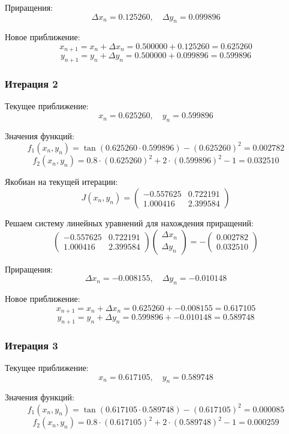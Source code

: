 \documentclass{article}
\begin{document}
Приращения:
\[
\Delta x_n = 0.125260, \quad \Delta y_n = 0.099896
\]

Новое приближение:
\[
x_{n+1} = x_n + \Delta x_n = 0.500000 + 0.125260 = 0.625260
\]
\[
y_{n+1} = y_n + \Delta y_n = 0.500000 + 0.099896 = 0.599896
\]

\subsubsection*{Итерация 2}

Текущее приближение:
\[
x_n = 0.625260, \quad y_n = 0.599896
\]

Значения функций:
\[
f_1(x_n, y_n) = \tan(0.625260 \cdot 0.599896) - (0.625260)^2 = 0.002782
\]
\[
f_2(x_n, y_n) = 0.8 \cdot (0.625260)^2 + 2 \cdot (0.599896)^2 - 1 = 0.032510
\]

Якобиан на текущей итерации:
\[
J(x_n, y_n) = \begin{pmatrix}
-0.557625 & 0.722191 \\
1.000416 & 2.399584
\end{pmatrix}
\]

Решаем систему линейных уравнений для нахождения приращений:
\[
\begin{pmatrix}
-0.557625 & 0.722191 \\
1.000416 & 2.399584
\end{pmatrix}
\begin{pmatrix}
\Delta x_n \\
\Delta y_n
\end{pmatrix}
= -\begin{pmatrix}
0.002782 \\
0.032510
\end{pmatrix}
\]

Приращения:
\[
\Delta x_n = -0.008155, \quad \Delta y_n = -0.010148
\]

Новое приближение:
\[
x_{n+1} = x_n + \Delta x_n = 0.625260 + -0.008155 = 0.617105
\]
\[
y_{n+1} = y_n + \Delta y_n = 0.599896 + -0.010148 = 0.589748
\]

\subsubsection*{Итерация 3}

Текущее приближение:
\[
x_n = 0.617105, \quad y_n = 0.589748
\]

Значения функций:
\[
f_1(x_n, y_n) = \tan(0.617105 \cdot 0.589748) - (0.617105)^2 = 0.000085
\]
\[
f_2(x_n, y_n) = 0.8 \cdot (0.617105)^2 + 2 \cdot (0.589748)^2 - 1 = 0.000259
\]
\end{document}
